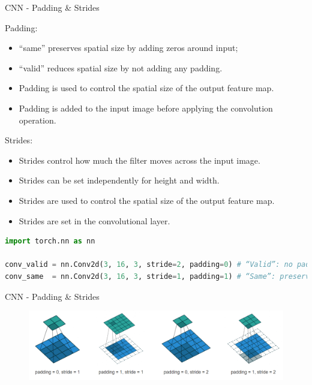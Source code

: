 \begin{frame}[fragile]{CNN - Padding & Strides}
\begin{block}{Padding:}
    \begin{itemize}
        \item “same” preserves spatial size by adding zeros around input;
        \item “valid” reduces spatial size by not adding any padding.
        \item Padding is used to control the spatial size of the output feature map.
        \item Padding is added to the input image before applying the convolution operation.
    \end{itemize}
\end{block}

\begin{block}{Strides:}
    \begin{itemize}
        \item Strides control how much the filter moves across the input image.
        \item Strides can be set independently for height and width.
        \item Strides are used to control the spatial size of the output feature map.
        \item Strides are set in the convolutional layer.
    \end{itemize}
\end{block}

\begin{lstlisting}[language=Python, caption={Code snippet (PyTorch)}, basicstyle=\ttfamily\footnotesize]
import torch.nn as nn

conv_valid = nn.Conv2d(3, 16, 3, stride=2, padding=0) # “Valid”: no padding (padding=0)
conv_same  = nn.Conv2d(3, 16, 3, stride=1, padding=1) # “Same”: preserve size
\end{lstlisting}
\end{frame}  

\begin{frame}{CNN - Padding & Strides}
    \begin{figure}
    \centering
    \includegraphics[width=1\textwidth,height=1\textheight,keepaspectratio]{images/padding-stride.png}
    \end{figure}
\end{frame}